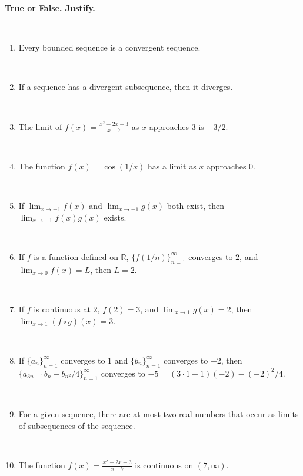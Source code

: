 \documentclass[12pt]{amsart}
\newcommand{\R}{{\mathbb{R}}}
\numberwithin{equation}{section}
\theoremstyle{plain} %
\theoremstyle{definition}
\theoremstyle{remark}
\begin{document}
{\large \textbf{True or False. Justify.}}

\thispagestyle{empty}
\

\begin{enumerate}

\item  Every bounded sequence is a convergent sequence.
	
	\
	
\item  If a sequence has a divergent subsequence, then it diverges.
	
	\

\item  The limit of $f(x)=\frac{x^2 - 2x + 3}{x-7}$ as $x$ approaches $3$ is $-3/2$.
	
	\

	\item  The function $f(x)=\cos(1/x)$ has a limit as $x$ approaches $0$.
	
	\
		
	\item  If $\lim_{x\to -1} f(x)$ and $\lim_{x\to -1} g(x)$ both exist, then $\lim_{x\to -1} f(x)g(x)$ exists.
	
	\
	

	
\item  If $f$ is a function defined on $\R$, $\{ f(1/n) \}_{n=1}^\infty$ converges to $2$, and
 ${\lim_{x\to 0} f(x)=L}$, then $L=2$.

\



\item  If $f$ is continuous at $2$, $f(2)=3$, and ${\lim_{x\to 1} g(x)=2}$, then ${\lim_{x\to 1}  (f\circ g)(x) = 3}$.
 
 
	 
	
	 \
	 
	 	\item  If $\{a_n\}_{n=1}^\infty$ converges to $1$ and $\{b_n\}_{n=1}^\infty$ converges to $-2$, then ${\{a_{3n-1} b_{n} - b_{n^2}/4\}_{n=1}^{\infty}}$ converges to $-5 = (3\cdot 1 - 1)(-2) - (-2)^2/4$. 
		
\

 \item  For a given sequence, there are at most two real numbers that occur as limits of subsequences of the sequence.
 
 \

 	 \item  The function $f(x) = \frac{x^2 - 2x + 3}{x-7}$ is continuous on $(7,\infty)$.
	 

\end{enumerate}
\end{document}
